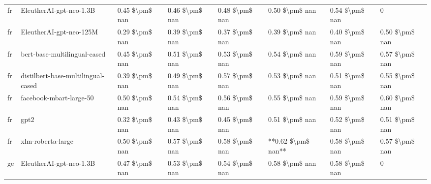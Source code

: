 \begin{tabular}{llllllll}
      fr &            EleutherAI-gpt-neo-1.3B & 0.45 \$\textbackslash pm\$ nan &            0.46 \$\textbackslash pm\$ nan &        0.48 \$\textbackslash pm\$ nan &         0.50 \$\textbackslash pm\$ nan &                          0.54 \$\textbackslash pm\$ nan &                  0 \\
      fr &            EleutherAI-gpt-neo-125M & 0.29 \$\textbackslash pm\$ nan &            0.39 \$\textbackslash pm\$ nan &        0.37 \$\textbackslash pm\$ nan &         0.39 \$\textbackslash pm\$ nan &                          0.40 \$\textbackslash pm\$ nan &     0.50 \$\textbackslash pm\$ nan \\
      fr &       bert-base-multilingual-cased & 0.45 \$\textbackslash pm\$ nan &            0.51 \$\textbackslash pm\$ nan &        0.53 \$\textbackslash pm\$ nan &         0.54 \$\textbackslash pm\$ nan &                          0.59 \$\textbackslash pm\$ nan &     0.57 \$\textbackslash pm\$ nan \\
      fr & distilbert-base-multilingual-cased & 0.39 \$\textbackslash pm\$ nan &            0.49 \$\textbackslash pm\$ nan &        0.57 \$\textbackslash pm\$ nan &         0.53 \$\textbackslash pm\$ nan &                          0.51 \$\textbackslash pm\$ nan &     0.55 \$\textbackslash pm\$ nan \\
      fr &            facebook-mbart-large-50 & 0.50 \$\textbackslash pm\$ nan &            0.54 \$\textbackslash pm\$ nan &        0.56 \$\textbackslash pm\$ nan &         0.55 \$\textbackslash pm\$ nan &                          0.59 \$\textbackslash pm\$ nan &     0.60 \$\textbackslash pm\$ nan \\
      fr &                               gpt2 & 0.32 \$\textbackslash pm\$ nan &            0.43 \$\textbackslash pm\$ nan &        0.45 \$\textbackslash pm\$ nan &         0.51 \$\textbackslash pm\$ nan &                          0.52 \$\textbackslash pm\$ nan &     0.51 \$\textbackslash pm\$ nan \\
      fr &                  xlm-roberta-large & 0.50 \$\textbackslash pm\$ nan &            0.57 \$\textbackslash pm\$ nan &        0.58 \$\textbackslash pm\$ nan &     **0.62 \$\textbackslash pm\$ nan** &                          0.58 \$\textbackslash pm\$ nan &     0.57 \$\textbackslash pm\$ nan \\
      ge &            EleutherAI-gpt-neo-1.3B & 0.47 \$\textbackslash pm\$ nan &            0.53 \$\textbackslash pm\$ nan &        0.54 \$\textbackslash pm\$ nan &         0.58 \$\textbackslash pm\$ nan &                          0.58 \$\textbackslash pm\$ nan &                  0 \\

\end{tabular}
